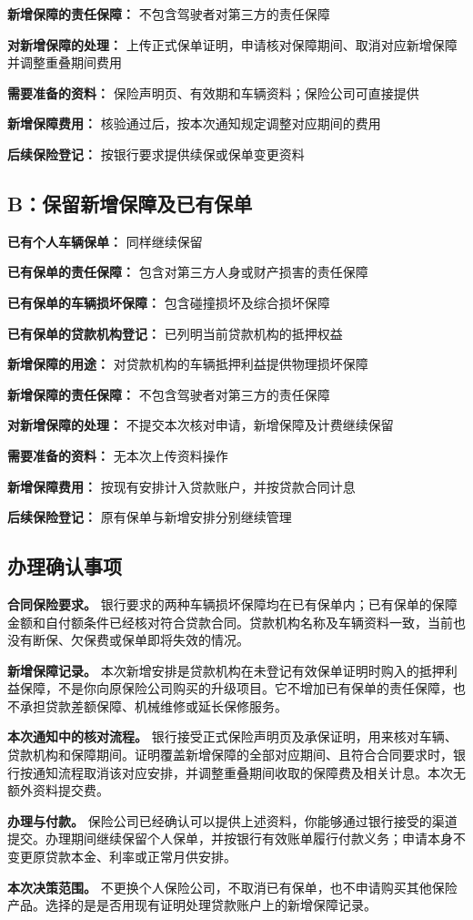 \documentclass[UTF8,fontset=none,11pt,a4paper]{ctexart}
\begin{document}
\textbf{新增保障的责任保障：} 不包含驾驶者对第三方的责任保障


\textbf{对新增保障的处理：} 上传正式保单证明，申请核对保障期间、取消对应新增保障并调整重叠期间费用


\textbf{需要准备的资料：} 保险声明页、有效期和车辆资料；保险公司可直接提供


\textbf{新增保障费用：} 核验通过后，按本次通知规定调整对应期间的费用


\textbf{后续保险登记：} 按银行要求提供续保或保单变更资料


\subsection*{B：保留新增保障及已有保单}
\textbf{已有个人车辆保单：} 同样继续保留


\textbf{已有保单的责任保障：} 包含对第三方人身或财产损害的责任保障


\textbf{已有保单的车辆损坏保障：} 包含碰撞损坏及综合损坏保障


\textbf{已有保单的贷款机构登记：} 已列明当前贷款机构的抵押权益


\textbf{新增保障的用途：} 对贷款机构的车辆抵押利益提供物理损坏保障


\textbf{新增保障的责任保障：} 不包含驾驶者对第三方的责任保障


\textbf{对新增保障的处理：} 不提交本次核对申请，新增保障及计费继续保留


\textbf{需要准备的资料：} 无本次上传资料操作


\textbf{新增保障费用：} 按现有安排计入贷款账户，并按贷款合同计息


\textbf{后续保险登记：} 原有保单与新增安排分别继续管理


\subsection*{办理确认事项}
\textbf{合同保险要求。} 银行要求的两种车辆损坏保障均在已有保单内；已有保单的保障金额和自付额条件已经核对符合贷款合同。贷款机构名称及车辆资料一致，当前也没有断保、欠保费或保单即将失效的情况。


\textbf{新增保障记录。} 本次新增安排是贷款机构在未登记有效保单证明时购入的抵押利益保障，不是你向原保险公司购买的升级项目。它不增加已有保单的责任保障，也不承担贷款差额保障、机械维修或延长保修服务。


\textbf{本次通知中的核对流程。} 银行接受正式保险声明页及承保证明，用来核对车辆、贷款机构和保障期间。证明覆盖新增保障的全部对应期间、且符合合同要求时，银行按通知流程取消该对应安排，并调整重叠期间收取的保障费及相关计息。本次无额外资料提交费。


\textbf{办理与付款。} 保险公司已经确认可以提供上述资料，你能够通过银行接受的渠道提交。办理期间继续保留个人保单，并按银行有效账单履行付款义务；申请本身不变更原贷款本金、利率或正常月供安排。


\textbf{本次决策范围。} 不更换个人保险公司，不取消已有保单，也不申请购买其他保险产品。选择的是是否用现有证明处理贷款账户上的新增保障记录。
\end{document}
